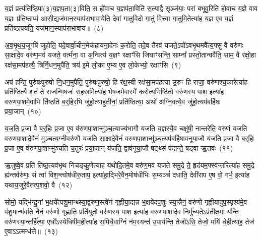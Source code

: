 य॒ज्ञं प्रत्य॑तिष्ठि॒पा(३)य॒ज्ञप॒ता(३)विति॒ स हो॑वाच य॒ज्ञप॑ता॒विति॑ स॒त्याद्वै सृञ्ज॑याः॒ परा॑ बभूवु॒रिति॑ होवाच य॒ज्ञे वाव य॒ज्ञः प्र॑ति॒ष्ठाप्य॑ आसी॒द्यज॑मान॒स्याप॑राभावा॒येति॒ देवा॑ गातुविदो गा॒तुं वि॒त्त्वा गा॒तुमि॒तेत्या॑ह य॒ज्ञ ए॒व य॒ज्ञं प्रति॑\-ष्ठापयति॒ यज॑मान॒स्याप॑राभावाय॥~(८)\ip

{\anuvakamend[{यजूꣳ॑षि य॒ज्ञ एक॑चत्वारिꣳशच्च}]}

अ॒व॒भृ॒थ॒य॒जूꣳषि॑ जुहोति॒ यदे॒वार्वा॒चीन॒मेक॑हायना॒देनः॑ क॒रोति॒ तदे॒व तैरव॑ यजते॒\-ऽपो॑\-ऽवभृ॒थमवै᳚त्य॒फ्सु वै वरु॑णः सा॒क्षादे॒व वरु॑ण॒मव॑ यजते॒ वर्त्म॑ना॒ वा अ॒न्वित्य॑ य॒ज्ञꣳ रक्षाꣳ॑सि जिघाꣳसन्ति॒ साम्ना᳚ प्रस्तो॒तान्ववै॑ति॒ साम॒ वै र॑क्षो॒हा रक्ष॑सा॒मप॑हत्यै॒ त्रिर्नि॒धन॒मुपै॑ति॒ त्रय॑ इ॒मे लो॒का ए॒भ्य ए॒व लो॒केभ्यो॒ रक्षाꣳ॑सि~(९)\ip

अप॑ हन्ति॒ पुरु॑षःपुरुषो नि॒धन॒मुपै॑ति॒ पुरु॑षःपुरुषो॒ हि र॑क्ष॒स्वी रक्ष॑सा॒मप॑हत्या उ॒रुꣳ हि राजा॒ वरु॑णश्च॒कारेत्या॑ह॒ प्रति॑ष्ठित्यै श॒तं ते॑ राजन्भि॒षजः॑ स॒हस्र॒मित्या॑ह भेष॒जमे॒वास्मै॑ करोत्य॒भिष्ठि॑तो॒ वरु॑णस्य॒ पाश॒ इत्या॑ह वरुणपा॒शमे॒वाभि ति॑ष्ठति ब॒र्॒\mbox{}हिर॒भि जु॑हो॒त्याहु॑तीनां॒ प्रति॑ष्ठित्या॒ अथो॑ अग्नि॒वत्ये॒व जु॑हो॒त्यप॑बर्\mbox{}हिषः प्रया॒जान्~(१०)\ip

य॒ज॒ति॒ प्र॒जा वै ब॒र्॒\mbox{}हिः प्र॒जा ए॒व व॑रुणपा॒शान्मु॑ञ्च॒त्याज्य॑भागौ यजति य॒ज्ञस्यै॒व चक्षु॑षी॒ नान्तरे॑ति॒ वरु॑णं यजति वरुणपा॒शादे॒वैनं॑ मुञ्चत्य॒ग्नीवरु॑णौ यजति सा॒क्षादे॒वैनं॑ वरुणपा॒शान्मु॑ञ्च॒त्यप॑बर्\mbox{}हिषावनूया॒जौ य॑जति प्र॒जा वै ब॒र्॒\mbox{}हिः प्र॒जा ए॒व व॑रुणपा॒शान्मु॑ञ्चति च॒तुरः॑ प्रया॒जान् य॑जति॒ द्वाव॑नूया॒जौ षट्थ्सं प॑द्यन्ते॒ षड्वा ऋ॒तवः॑~(११)\ip

ऋ॒तुष्वे॒व प्रति॑ तिष्ठ॒त्यव॑भृथ निचङ्कु॒णेत्या॑ह यथोदि॒तमे॒व वरु॑ण॒मव॑ यजते समु॒द्रे ते॒ हृद॑यम॒फ्स्व॑न्तरित्या॑ह समु॒द्रे ह्य॑न्तर्वरु॑णः॒ सं त्वा॑ विश॒न्त्वोष॑धीरु॒ताप॒ इत्या॑हा॒द्भिरे॒वैन॒मोष॑धीभिः स॒म्यञ्चं॑ दधाति॒ देवी॑राप ए॒ष वो॒ गर्भ॒ इत्या॑ह यथाय॒जुरे॒वैतत्प॒शवो॒ वै~(१२)\ip

सोमो॒ यद्भि॑न्दू॒नां भ॒क्षये᳚त्पशु॒मान्थ्स्या॒द्वरु॑ण॒स्त्वे॑नं गृह्णीया॒द्यन्न भ॒क्षये॑दप॒शुः स्या॒न्नैनं॒ वरु॑णो गृह्णीयादुप॒स्पृश्य॑मे॒व प॑शु॒मान्भ॑वति॒ नैनं॒ वरु॑णो गृह्णाति॒ प्रति॑युतो॒ वरु॑णस्य॒ पाश॒ इत्या॑ह वरुणपा॒शादे॒व निर्मु॑च्य॒ते\-ऽप्र॑तीक्ष॒मा य॑न्ति॒ वरु॑णस्या॒न्तर्\mbox{}हि॑त्या॒ एधो᳚\-ऽस्येधिषीम॒हीत्या॑ह स॒मिधै॒वाग्निं न॑म॒स्यन्त॑ उ॒पाय॑न्ति॒ तेजो॑\-ऽसि॒ तेजो॒ मयि॑ धे॒हीत्या॑ह॒ तेज॑ ए॒वा\-ऽऽ\-त्मन्ध॑त्ते॥~(१३)\ip

{\anuvakamend[{रक्षाꣳ॑सि प्रया॒जानृ॒तवो॒ वै न॑म॒स्यन्तो॒ द्वाद॑श च}]}

